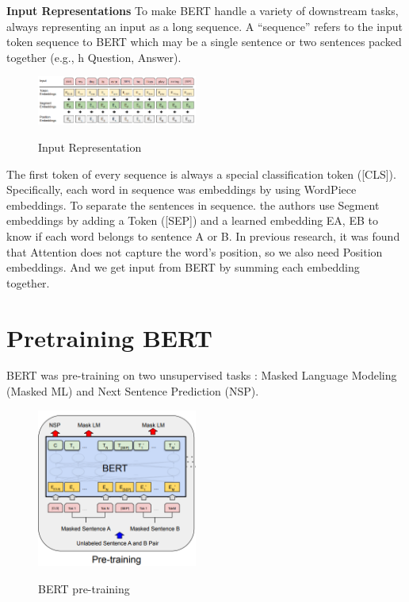 \documentclass[11pt]{article}
\begin{document}
\textbf{Input Representations} To make BERT handle a variety of downstream tasks, always representing an input as a long sequence. A “sequence” refers to the input token sequence to BERT which may be a single sentence or two sentences packed together (e.g., h Question, Answer). \\

\begin{figure}[h]
    \centering
    \includegraphics[width=0.47\textwidth]{BERT_input.png} \\
    \caption{Input Representation}
    \label{fig2}
\end{figure}


The first token of every sequence is always a special classification token ([CLS]). Specifically, each word in sequence was embeddings by using WordPiece embeddings. To separate the sentences in sequence. the authors use Segment embeddings by adding a Token ([SEP]) and a learned embedding EA, EB to know if each word belongs to sentence A or B. In previous research, it was found that Attention does not capture the word's position, so we also need Position embeddings. And we get input from BERT by summing each embedding together.


\section{Pretraining BERT}
\quad BERT was pre-training on two unsupervised tasks : Masked Language Modeling (Masked ML) and Next Sentence Prediction (NSP).

\begin{figure}
    \centering
    \includegraphics[width=0.47\textwidth]{pretraining.png} \\
    \caption{BERT pre-training}
    \label{fig:my_label}
\end{figure}
\end{document}

